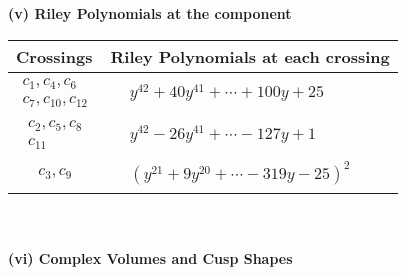 \documentclass[1p]{elsarticle_modified}
\theoremstyle{definition}
\begin{document}
\newpage\renewcommand{\arraystretch}{1}
\flushleft \textbf{(v) Riley Polynomials at the component}\newline \\
\begin{tabular}{m{50pt}|m{274pt}}
Crossings & \hspace{64pt}Riley Polynomials at each crossing \\
\hline $$\begin{aligned}c_{1},c_{4},c_{6}\\c_{7},c_{10},c_{12}\end{aligned}$$&$\begin{aligned}
&y^{42}+40 y^{41}+\cdots+100 y+25
\end{aligned}$\\
\hline $$\begin{aligned}c_{2},c_{5},c_{8}\\c_{11}\end{aligned}$$&$\begin{aligned}
&y^{42}-26 y^{41}+\cdots-127 y+1
\end{aligned}$\\
\hline $$\begin{aligned}c_{3},c_{9}\end{aligned}$$&$\begin{aligned}
&(y^{21}+9 y^{20}+\cdots-319 y-25)^{2}
\end{aligned}$\\
\hline
\end{tabular}\\~\\
\newpage\flushleft \textbf{(vi) Complex Volumes and Cusp Shapes}
\end{document}
